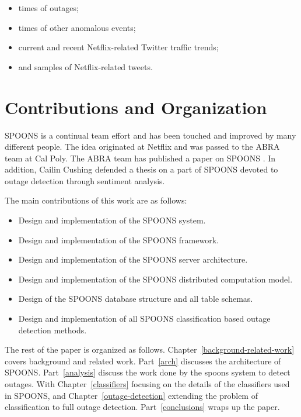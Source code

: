 \documentclass[12pt]{ucthesis}
\begin{document}
\begin{itemize}
   \item times of outages;
   \item times of other anomalous events;
   \item current and recent Netflix-related Twitter traffic trends;
   \item and samples of Netflix-related tweets.
\end{itemize}

\chapter{Contributions and Organization}
\label{contributions-organization}

SPOONS is a continual team effort and has been touched and improved by many different people.
The idea originated at Netflix and was passed to the ABRA team at Cal Poly.
The ABRA team has published a paper on SPOONS \cite{abraPaper}.
In addition, Cailin Cushing defended a thesis on a part of SPOONS devoted to outage detection through sentiment analysis\cite{cailinThesis}.

The main contributions of this work are as follows:

\begin{itemize}
   \item Design and implementation of the SPOONS system.
   \item Design and implementation of the SPOONS framework.
   \item Design and implementation of the SPOONS server architecture.
   \item Design and implementation of the SPOONS distributed computation model.
   \item Design of the SPOONS database structure and all table schemas.
   \item Design and implementation of all SPOONS classification based outage detection methods.
\end{itemize}

The rest of the paper is organized as follows.
Chapter~\ref{background-related-work} covers background and related work.
Part~\ref{arch} discusses the architecture of SPOONS.
Part~\ref{analysis} discuss the work done by the spoons system to detect outages.
With Chapter~\ref{classifiers} focusing on the details of the classifiers used in SPOONS, and
Chapter~\ref{outage-detection} extending the problem of classification to full outage detection.
Part~\ref{conclusions} wraps up the paper.
\end{document}

